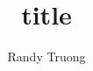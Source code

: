 \documentclass{report}
\title{title}
\author{Randy Truong}
\begin{document}
\begin{sloppypar}


\end{sloppypar}
\end{document}
